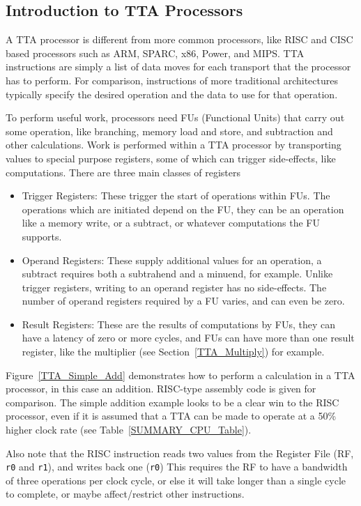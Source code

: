 \subsection{Introduction to TTA Processors}
A TTA processor is different from more common processors, like RISC and CISC
based processors such as ARM, SPARC, x86, Power, and MIPS. TTA instructions are
simply a list of data moves for each transport that the processor has to perform.
For comparison, instructions of more traditional architectures typically specify
the desired operation and the data to use for that operation.

To perform useful work, processors need FUs (Functional Units) that carry out
some operation, like branching, memory load and store, and subtraction and other
calculations. Work is performed within a TTA processor by transporting values to
special purpose registers, some of which can trigger side-effects, like
computations. There are three main classes of registers

\begin{itemize}
  \item Trigger Registers: These trigger the start of operations within FUs.
  The operations which are initiated depend on the FU, they can be an
  operation like a memory write, or a subtract, or whatever computations the FU
  supports.
  \item Operand Registers: These supply additional values for an operation, a
  subtract requires both a subtrahend and a minuend, for example. Unlike
  trigger registers, writing to an operand register has no side-effects. The
  number of operand registers required by a FU varies, and can even be zero.
  \item Result Registers: These are the results of computations by FUs, they
  can have a latency of zero or more cycles, and FUs can have more than one
  result register, like the multiplier (see Section~\ref{TTA_Multiply}) for
  example.
\end{itemize}

Figure~\ref{TTA_Simple_Add} demonstrates how to perform a calculation in a TTA
processor, in this case an addition. RISC-type assembly code is given for
comparison. The simple addition example looks to be a clear win to the RISC
processor, even if it is assumed that a TTA can be made to operate at a 50\%
higher clock rate (see Table~\ref{SUMMARY_CPU_Table}).

Also note that the RISC instruction reads two values from the Register
File (RF, \texttt{r0} and
\texttt{r1}), and writes back one (\texttt{r0}) This requires the RF to have a
bandwidth of three operations per clock cycle, or else it will take longer than a
single cycle to complete, or maybe affect/restrict other instructions.


